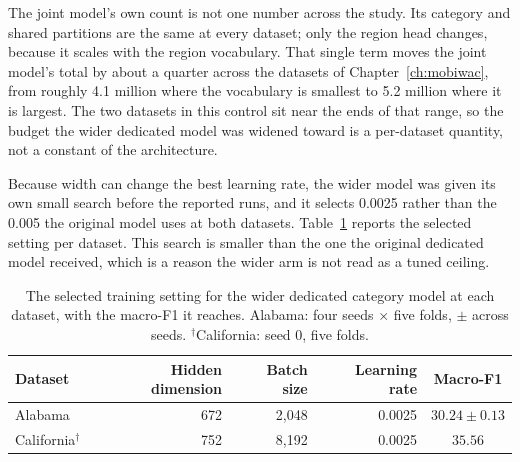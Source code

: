 The joint model's own count is not one number across the study. Its category and shared partitions
are the same at every dataset; only the region head changes, because it scales with the region
vocabulary. That single term moves the joint model's total by about a quarter across the datasets of
Chapter~\ref{ch:mobiwac}, from roughly 4.1 million where the vocabulary is smallest to 5.2 million
where it is largest. The two datasets in this control sit near the ends of that range, so the
budget the wider dedicated model was widened toward is a per-dataset quantity, not a constant of the
architecture.

Because width can change the best learning rate, the wider model was given its own small search
before the reported runs, and it selects 0.0025 rather than the 0.005 the original model uses at
both datasets. Table~\ref{tab:apx-parameter-arms} reports the selected setting per dataset. This
search is smaller than the one the original dedicated model received, which is a reason the wider
arm is not read as a tuned ceiling.

\begin{table}[H]
    \centering
    \caption{The selected training setting for the wider dedicated category model at each dataset,
    with the macro-F1 it reaches. Alabama: four seeds $\times$ five folds, $\pm$ across seeds.
    $^{\dagger}$California: seed 0, five folds.}
    \label{tab:apx-parameter-arms}
    \begin{tabular}{lrrrc}
        \toprule
        Dataset & Hidden dimension & Batch size & Learning rate & Macro-F1 \\
        \midrule
        Alabama                 & 672 & 2,048 & 0.0025 & $30.24 \pm 0.13$ \\
        California$^{\dagger}$  & 752 & 8,192 & 0.0025 & $35.56$ \\
        \bottomrule
    \end{tabular}
\end{table}

